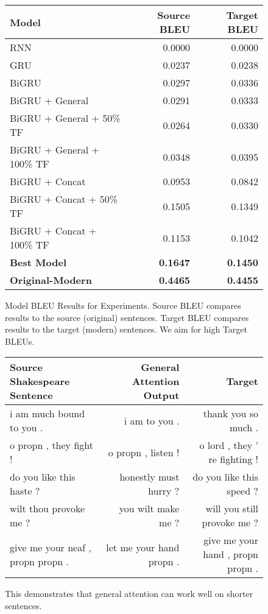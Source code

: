 \documentclass[twoside,twocolumn]{article}
\begin{document}
\begin{figure*}
    \centering
    \begin{tabular}{ |l|r|r| }
        \hline
        \textbf{Model}
          & \textbf{Source BLEU} & \textbf{Target BLEU} \\
        \hline
        RNN                             & 0.0000 & 0.0000 \\ \hline
        GRU                             & 0.0237 & 0.0238 \\ \hline
        BiGRU                           & 0.0297 & 0.0336 \\ \hline
        BiGRU + General                 & 0.0291 & 0.0333 \\ \hline
        BiGRU + General + 50\% TF       & 0.0264 & 0.0330 \\ \hline
        BiGRU + General + 100\% TF      & 0.0348 & 0.0395 \\ \hline
        BiGRU + Concat                  & 0.0953 & 0.0842 \\ \hline
        BiGRU + Concat + 50\% TF        & 0.1505 & 0.1349 \\ \hline
        BiGRU + Concat + 100\% TF       & 0.1153 & 0.1042 \\ \hline
        \textbf{Best Model}             & \textbf{0.1647} & \textbf{0.1450} \\ \hline
        \textbf{Original-Modern}  & \textbf{0.4465} & \textbf{0.4455} \\ \hline
    \end{tabular}

    \caption{Model BLEU Results for Experiments. Source BLEU compares results
    to the source (original) sentences. Target BLEU compares results to
    the target (modern) sentences. We aim for high Target BLEUs.}
    \label{fig:model-bleu}
\end{figure*}

\begin{figure*}
    \centering
    \begin{tabular}{ |l|r|r| }
        \hline
        \textbf{Source Shakespeare Sentence}
          & \textbf{General Attention Output} & \textbf{Target} \\
        \hline
        i am much bound to you .          & i am to you .       
        & thank you so much .             \\ \hline
        o propn , they fight !            & o propn , listen !  
        & o lord , they ’ re fighting !   \\ \hline
        do you like this haste ?          & honestly must hurry ? 
        & do you like this speed ?        \\ \hline
        wilt thou provoke me ?            & you wilt make me ? 
        & will you still provoke me ?     \\ \hline
        give me your neaf , propn propn . & let me your hand propn . 
        & give me your hand , propn propn . \\ \hline
    \end{tabular}

    \caption{ This demonstrates that general attention can work well on shorter sentences.}
    \label{fig:short-results}
\end{figure*}
\end{document}
